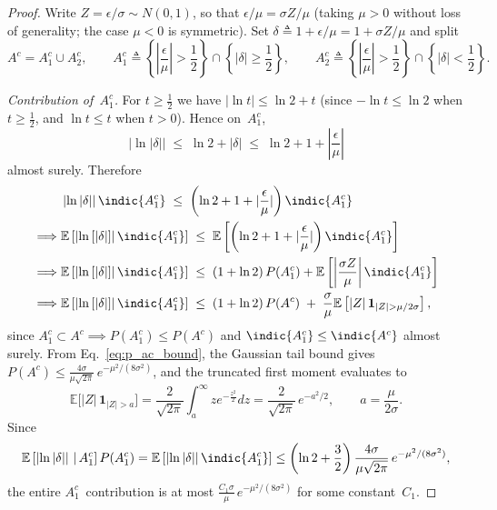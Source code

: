 \documentclass[12pt,onecolumn, margin=1in]{IEEEtran}
\newcommand{\bracket}[1]{\left[ #1 \right]}
\newcommand{\paren}[1]{\left( #1 \right)}
\newcommand{\abs}[1]{\left| #1 \right|}
\newcommand{\E}[1]{\mathbb{E}\left[ #1 \right]}
\begin{document}
\begin{proof}
Write $Z = \epsilon/\sigma \sim N(0,1)$, so that $\epsilon/\mu = \sigma Z/\mu$
(taking $\mu>0$ without loss of generality; the case $\mu<0$ is symmetric).
Set $\delta \triangleq 1 + \epsilon/\mu = 1 + \sigma Z/\mu$ and split
\begin{equation}
  A^c = A_1^c \cup A_2^c, \qquad
  A_1^c \triangleq \left\{\abs{\frac{\epsilon}{\mu}}>\frac{1}{2}\right\} \cap \left\{\abs{\delta}\ge \frac{1}{2}\right\},\qquad
  A_2^c \triangleq \left\{\abs{\frac{\epsilon}{\mu}}>\frac{1}{2}\right\} \cap \left\{\abs{\delta} < \frac{1}{2}\right\}.
\end{equation}

\medskip
\noindent\textit{Contribution of~$A_1^c$.}\enspace
For $t \ge \frac{1}{2}$ we have $|\ln t| \le \ln 2 + t$
(since $-\ln t \leq \ln 2$ when $t \geq \frac{1}{2}$,
and $\ln t \le t$ when $t > 0$). Hence on~$A_1^c$,
\begin{equation}
  |\ln{\abs{\delta}}| \;\le\; \ln 2 + |\delta|
  \;\le\; \ln 2 + 1 + |\frac{\epsilon}{\mu}|
\end{equation}
almost surely.
Therefore
\begin{align}
&\abs{\ln|\delta|}\indic{A_1^c} \;\le\; \paren{\ln 2 + 1 + |\frac{\epsilon}{\mu}|}\indic{A_1^c}\\
  \implies &\E{\abs{\ln\bracket{|\delta|}}\indic{A_1^c}}
  \;\le\; \E{\paren{\ln 2 + 1 + |\frac{\epsilon}{\mu}|}\indic{A_1^c}}\\
  \implies &\E{\abs{\ln\bracket{|\delta|}}\indic{A_1^c}}
  \;\le\; (1+\ln 2)\,P(A_1^c) + \E{\abs{\frac{\sigma Z}{\mu}}\indic{A_1^c}}\\
    \implies &\E{\abs{\ln\bracket{|\delta|}}\indic{A_1^c}}
  \;\le\; (1+\ln 2)\,P(A^c) \;+\;
    \frac{\sigma}{\mu}\E{|Z|\,\mathbf{1}_{|Z|>\mu/2\sigma}},
\end{align}
since $A_1^c \subset A^c \implies P(A_1^c) \leq P(A^c)$ and $\indic{A_1^c} \leq \indic{A^c}$ almost surely.
From Eq.~\eqref{eq:p_ac_bound}, the Gaussian tail bound gives
$P(A^c) \leq \frac{4\sigma}{\mu\sqrt{2\pi}}\,e^{-\mu^2/(8\sigma^2)}$,
and the truncated first moment evaluates to
\begin{equation}
  \mathbb{E}\bigl[|Z|\,\mathbf{1}_{|Z|>a}\bigr]
  = \frac{2}{\sqrt{2\pi}}\int_a^\infty ze^{-\frac{z^2}{2}}dz = \frac{2}{\sqrt{2\pi}}\,e^{-a^2/2},
  \qquad a = \frac{\mu}{2\sigma}.
\end{equation}
Since \begin{equation}
    \E{\abs{\ln\abs{\delta}} \,|\, A_1^c}P(A_1^c) = \E{\abs{\ln\abs{\delta}}\indic{A_1^c}} \leq \paren{\ln 2 + \frac{3}{2}}\frac{4\sigma}{\mu\sqrt{2\pi}}\,e^{-\mu^2/(8\sigma^2)},
\end{equation}
the entire $A_1^c$~contribution is at most
$\frac{C_1\sigma}{\mu}\,e^{-\mu^2/(8\sigma^2)}$ for some constant~$C_1$.


\end{proof}
\end{document}

